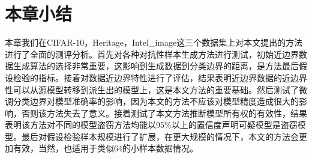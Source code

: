 \section{本章小结}

本章我们在CIFAR-10，Heritage，Intel\_image这三个数据集上对本文提出的方法进行了全面的测评分析。首先对各种对抗性样本生成方法进行测试，初始近边界数据生成算法的选择非常重要，这影响到生成数据到分类边界的距离，是方法最后假设检验的指标。接着对数据近边界特性进行了评估，结果表明近边界数据的近边界性可以从源模型转移到派生出的模型上，这是本文方法的重要基础。然后测试了微调分类边界对模型准确率的影响，因为本文的方法不应该对模型精度造成很大的影响，否则该方法失去了意义。接着测试了本文方法推断模型所有权的有效性，结果表明该方法对不同的模型盗窃方法均能以95\%以上的置信度声明可疑模型是盗窃模型。最后对假设检验样本规模进行了扩展，在更大规模的情况下，本文的方法会更加有效，当然，也适用于类似64的小样本数据情况。

